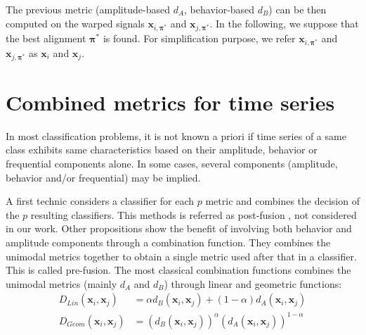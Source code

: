 The previous metric (amplitude-based $d_A$, behavior-based $d_B$) can be then computed on the warped signals $\textbf{x}_{i,\boldsymbol{\pi}^*}$ and $\textbf{x}_{j,\boldsymbol{\pi}^*}$. In the following, we suppose that the best alignment $\boldsymbol{\pi}^*$ is found. For simplification purpose, we refer $\textbf{x}_{i,\boldsymbol{\pi}^*}$ and $\textbf{x}_{j,\boldsymbol{\pi}^*}$ as $\textbf{x}_{i}$ and $\textbf{x}_{j}$. 



\section{Combined metrics for time series}

In most classification problems, it is not known a priori if time series of a same class exhibits same characteristics based on their amplitude,  behavior or frequential components alone. In some cases, several components (amplitude, behavior and/or frequential) may be implied. 

A first technic considers a classifier for each $p$ metric and combines the decision of the $p$ resulting classifiers. This methods is referred as post-fusion , not considered in our work. Other propositions show the benefit of involving both behavior and amplitude components through a combination function. They combines the unimodal metrics together to obtain a single metric used after that in a classifier. This is called pre-fusion. The most classical combination functions combines the unimodal metrics (mainly $d_A$ and $d_B$) through linear and geometric functions:
\begin{align}
D_{Lin}(\textbf{x}_i,\textbf{x}_j) &= \alpha d_{B}(\textbf{x}_i,\textbf{x}_j) + (1-\alpha) d_A(\textbf{x}_i,\textbf{x}_j)  \label{eq:DLin}   \\
D_{Geom}(\textbf{x}_i,\textbf{x}_j) &= (d_{B}(\textbf{x}_i,\textbf{x}_j))^\alpha  (d_A(\textbf{x}_i,\textbf{x}_j))^{1-\alpha} \label{eq:DGeom}
\end{align}


